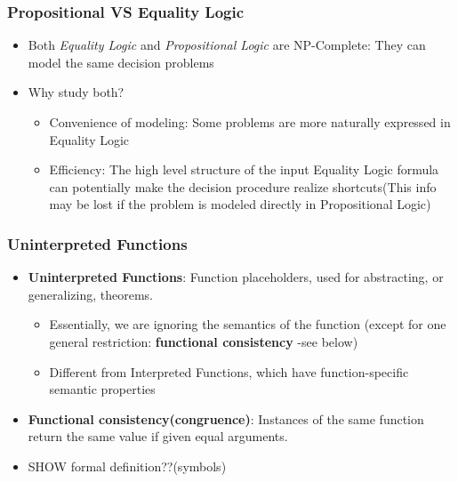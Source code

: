 \documentclass{beamer}
\begin{document}
\begin{frame}

 \frametitle{Propositional VS Equality Logic}
 
 \begin{itemize}
 \item Both \emph{Equality Logic} and \emph{Propositional Logic} are NP-Complete:  They can model the same decision problems
 \item Why study both?
 \begin {itemize}
 \item Convenience of modeling:  Some problems are more naturally expressed in Equality Logic
 \item Efficiency:  The high level structure of the input Equality Logic formula can potentially make the decision procedure realize shortcuts(This info may be lost if the problem is modeled directly in Propositional Logic)
 \end {itemize}
 
 \end{itemize}
 
\end{frame}


\begin{frame}

 \frametitle{Uninterpreted Functions}
 
 \begin{itemize}
 \item \textbf{Uninterpreted Functions}: Function placeholders, used for abstracting, or generalizing, theorems.    

\begin {itemize}
 \item Essentially, we are ignoring the semantics of the function (except for one general restriction:  \textbf{functional consistency} -see below)
 \item Different from Interpreted Functions, which have function-specific semantic properties
 \end{itemize}
 
 \item \textbf{Functional consistency(congruence)}:  Instances of the same function return the same value if given equal arguments.
 
 \item SHOW formal definition??(symbols)
 \end{itemize}
\end{frame}
\end{document}
